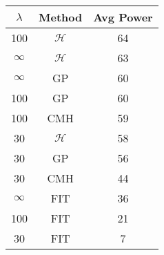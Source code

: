 \centering \begin{tabular}{c|c|c}
$\lambda$	&Method	&Avg Power\\\hline
100	&$\mathcal{H}$	&64\\
$\infty$	&$\mathcal{H}$	&63\\
$\infty$	&GP	&60\\
100	&GP	&60\\
100	&CMH	&59\\
30	&$\mathcal{H}$	&58\\
30	&GP	&56\\
30	&CMH	&44\\
$\infty$	&FIT	&36\\
100	&FIT	&21\\
30	&FIT	&7\\
\end{tabular}
